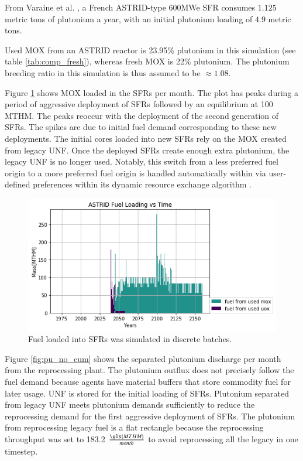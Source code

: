 From Varaine et al. \cite{varaine_pre-conceptual_2012}, a French
ASTRID-type 600\gls{MWe} \gls{SFR} consumes $1.125$ metric tons of
plutonium a year, with an initial plutonium loading of $4.9$ metric tons.
 
Used \gls{MOX} from an ASTRID reactor is 23.95\% plutonium
in this simulation (see table \ref{tab:comp_fresh}), whereas fresh \gls{MOX} is 22\% plutonium.
The plutonium breeding ratio in this simulation is thus assumed to be
$\approx 1.08$.

Figure \ref{fig:fuel} shows \gls{MOX} loaded in the \glspl{SFR} per month.  The plot 
has peaks during a period of aggressive deployment of \glspl{SFR} followed by 
an equilibrium at 100 \gls{MTHM}. The peaks reoccur with the deployment of the 
second generation of \glspl{SFR}.  The spikes are due to initial fuel demand 
corresponding to these new deployments.  The initial cores loaded into new 
\glspl{SFR} rely on the \gls{MOX} created from legacy \gls{UNF}. Once the 
deployed \glspl{SFR} create enough extra plutonium, the legacy \gls{UNF} is no 
longer used. Notably, this switch from a less preferred fuel origin to a more 
preferred fuel origin is handled automatically within \Cyclus via user-defined preferences 
within its dynamic resource exchange algorithm \cite{gidden_methodology_2016}.


\begin{figure}[htbp!]
	\begin{center}
		\includegraphics[width=1.0\textwidth]{./images/french-transition/where_fuel.png}
	\end{center}
	\caption{Fuel loaded into \glspl{SFR} was simulated in discrete 
        batches.}
	\label{fig:fuel}
\end{figure}

Figure \ref{fig:pu_no_cum} shows the separated plutonium discharge per 
month from the reprocessing plant. The plutonium outflux does not precisely 
follow the fuel demand because \Cyclus agents have material buffers that 
store commodity fuel for later usage. 
\gls{UNF} is stored for the initial loading of \glspl{SFR}.  Plutonium separated 
from legacy \gls{UNF} meets plutonium demands sufficiently to reduce the 
reprocessing demand for the first aggressive deployment of \glspl{SFR}.  
The plutonium from reprocessing legacy fuel is a flat rectangle because the 
reprocessing throughput was set to 183.2 $\frac{\gls{MTHM}}{month}$ to 
avoid reprocessing all the legacy in one timestep.
 

